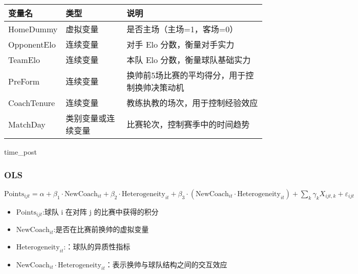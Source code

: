 \documentclass[
]{ctexart}
\providecommand{\tightlist}{%
  \setlength{\itemsep}{0pt}\setlength{\parskip}{0pt}}\usepackage{longtable,booktabs,array}
\begin{document}
\begin{longtable}[]{@{}
  >{\raggedright\arraybackslash}p{}
  >{\raggedright\arraybackslash}p{}
  >{\raggedright\arraybackslash}p{}@{}}
\toprule\noalign{}
\begin{minipage}[b]{\linewidth}\raggedright
变量名
\end{minipage} & \begin{minipage}[b]{\linewidth}\raggedright
类型
\end{minipage} & \begin{minipage}[b]{\linewidth}\raggedright
说明
\end{minipage} \\
\midrule\noalign{}
\endhead
\bottomrule\noalign{}
\endlastfoot
HomeDummy & 虚拟变量 & 是否主场（主场=1，客场=0） \\
OpponentElo & 连续变量 & 对手 Elo 分数，衡量对手实力 \\
TeamElo & 连续变量 & 本队 Elo 分数，衡量球队基础实力 \\
PreForm & 连续变量 & 换帅前5场比赛的平均得分，用于控制换帅决策动机 \\
CoachTenure & 连续变量 & 教练执教的场次，用于控制经验效应 \\
MatchDay & 类别变量或连续变量 & 比赛轮次，控制赛季中的时间趋势 \\
\end{longtable}

time\_post

\subsubsection{OLS}\label{ols}

\(\text{Points}_{ijt} = \alpha + \beta_1 \cdot \text{NewCoach}_{it} + \beta_2 \cdot \text{Heterogeneity}_{it} + \beta_3 \cdot (\text{NewCoach}_{it} \cdot \text{Heterogeneity}_{it}) + \sum_k \gamma_k X_{ijt,k} + \varepsilon_{ijt}\)

\begin{itemize}
\tightlist
\item
  \(\text{Points}_{ijt}\):球队 i 在对阵 j 的比赛中获得的积分
\item
  \(\text{NewCoach}_{it}\):是否在比赛前换帅的虚拟变量
\item
  \(\text{Heterogeneity}_{it}\):：球队的异质性指标
\item
  \(\text{NewCoach}_{it} \cdot \text{Heterogeneity}_{it}\)：表示换帅与球队结构之间的交互效应
\end{itemize}
\end{document}
